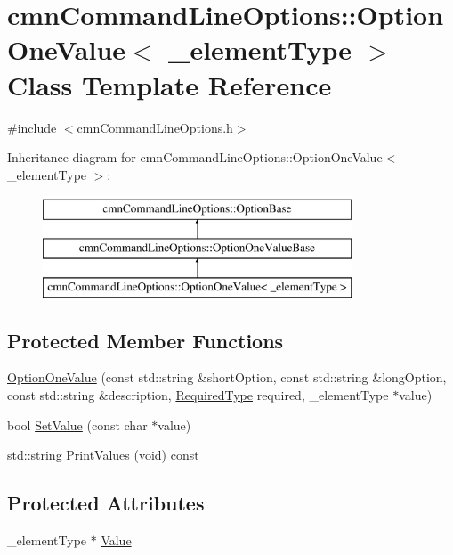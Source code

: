 \hypertarget{classcmn_command_line_options_1_1_option_one_value}{\section{cmn\-Command\-Line\-Options\-:\-:Option\-One\-Value$<$ \-\_\-element\-Type $>$ Class Template Reference}
\label{classcmn_command_line_options_1_1_option_one_value}
}


{\ttfamily \#include $<$cmn\-Command\-Line\-Options.\-h$>$}

Inheritance diagram for cmn\-Command\-Line\-Options\-:\-:Option\-One\-Value$<$ \-\_\-element\-Type $>$\-:\begin{figure}[H]
\begin{center}
\leavevmode
\includegraphics[height=3.000000cm]{de/d9b/classcmn_command_line_options_1_1_option_one_value}
\end{center}
\end{figure}
\subsection*{Protected Member Functions}
\begin{DoxyCompactItemize}
\item 
\hyperlink{classcmn_command_line_options_1_1_option_one_value_a225ab65ac17ffac26683ac170f5df9e8}{Option\-One\-Value} (const std\-::string \&short\-Option, const std\-::string \&long\-Option, const std\-::string \&description, \hyperlink{classcmn_command_line_options_ac239a3ca62dd4e3b391824f6f1a97c76}{Required\-Type} required, \-\_\-element\-Type $\ast$value)
\item 
bool \hyperlink{classcmn_command_line_options_1_1_option_one_value_a2b55be408875478f887e01550837cd1e}{Set\-Value} (const char $\ast$value)
\item 
std\-::string \hyperlink{classcmn_command_line_options_1_1_option_one_value_a01fcb11ad03b693bd181a83dfafe2d58}{Print\-Values} (void) const 
\end{DoxyCompactItemize}
\subsection*{Protected Attributes}
\begin{DoxyCompactItemize}
\item 
\-\_\-element\-Type $\ast$ \hyperlink{classcmn_command_line_options_1_1_option_one_value_a340ec92ab141ab98bc7469c78e970eb6}{Value}
\end{DoxyCompactItemize}
